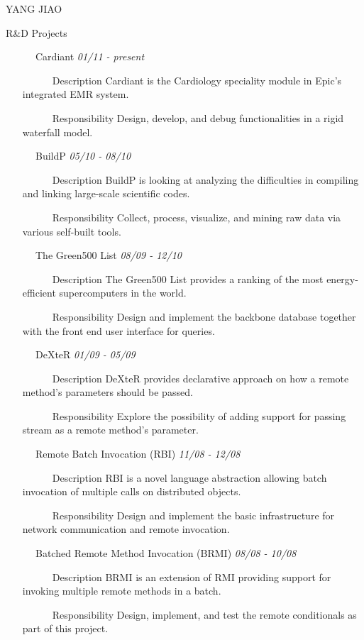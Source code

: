 \documentclass{article}
\begin{document}
\begin{cv}{YANG JIAO}
\begin{cvlist}{R\&D Projects}
\item [~~~~~~Cardiant] \hfill {\it 01/11 - present}
\begin{itemize}
\item [~~~~~~Description] Cardiant is the Cardiology speciality module in Epic's integrated EMR system.  
\item [~~~~~~Responsibility] Design, develop, and debug functionalities in a rigid waterfall model.
\end{itemize}
\item [~~~~~~BuildP] \hfill {\it 05/10 - 08/10}
\begin{itemize}
\item [~~~~~~Description] BuildP is looking at analyzing the difficulties in compiling and linking large-scale scientific codes. 
\item [~~~~~~Responsibility] Collect, process, visualize, and mining raw data via various self-built tools.
\end{itemize}
\item [~~~~~~The Green500 List] \hfill {\it 08/09 - 12/10}
\begin{itemize}
\item [~~~~~~Description] The Green500 List provides a ranking of the most energy-efficient supercomputers in the world. 
\item [~~~~~~Responsibility] Design and implement the backbone database together with the front end user interface for queries.
\end{itemize}
\item [~~~~~~DeXteR] \hfill {\it 01/09 - 05/09}
\begin{itemize}
\item [~~~~~~Description] DeXteR provides declarative approach on how a remote method's parameters should be passed. 
\item [~~~~~~Responsibility] Explore the possibility of adding support for passing stream as a remote method's parameter.
\end{itemize}
\item [~~~~~~Remote Batch Invocation (RBI)] \hfill {\it 11/08 - 12/08}
\begin{itemize}
\item [~~~~~~Description] RBI is a novel language abstraction allowing batch invocation of multiple calls on distributed objects\cite{Ibrahim0907}.
\item [~~~~~~Responsibility] Design and implement the basic infrastructure for network communication and remote invocation.
\end{itemize}
\item [~~~~~~Batched Remote Method Invocation (BRMI)] \hfill {\it 08/08 - 10/08}
\begin{itemize}
\item [~~~~~~Description] BRMI is an extension of RMI providing support for invoking multiple remote methods in a batch\cite{Tilevich0906}.
\item [~~~~~~Responsibility] Design, implement, and test the remote conditionals as part of this project.
\end{itemize}
\end{cvlist}


\end{cv}
\end{document}
